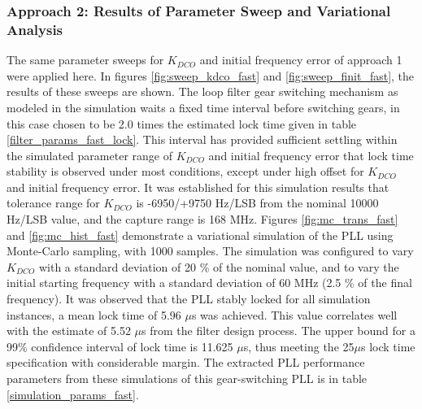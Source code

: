 \subsubsection{Approach 2: Results of Parameter Sweep and Variational Analysis}
The same parameter sweeps for $K_{DCO}$ and initial frequency error of approach 1 were applied here. In figures \ref{fig:sweep_kdco_fast} and \ref{fig:sweep_finit_fast}, the results of these sweeps are shown. The loop filter gear switching mechanism as modeled in the simulation waits a fixed time interval before switching gears, in this case chosen to be 2.0 times the estimated lock time given in table \ref{filter_params_fast_lock}. This interval has provided sufficient settling within the simulated parameter range of $K_{DCO}$ and initial frequency error that lock time stability is observed under most conditions, except under high offset for $K_{DCO}$ and initial frequency error. It was established for this simulation results that tolerance range for $K_{DCO}$ is -6950/+9750 Hz/LSB from the nominal 10000 Hz/LSB value, and the capture range is 168 MHz. Figures \ref{fig:mc_trans_fast} and \ref{fig:mc_hist_fast} demonstrate a variational simulation of the PLL using Monte-Carlo sampling, with 1000 samples. The simulation was configured to vary $K_{DCO}$ with a standard deviation of 20 \% of the nominal value, and to vary the initial starting frequency with a standard deviation of 60 MHz (2.5 \% of the final frequency). It was observed that the PLL stably locked for all simulation instances, a mean lock time of 5.96 $\mu$s was achieved. This value correlates well with the estimate of 5.52 $\mu$s from the filter design process. The upper bound for a 99\% confidence interval of lock time is 11.625 $\mu$s, thus meeting the 25$\mu$s lock time specification with considerable margin. The extracted PLL performance parameters from these simulations of this gear-switching PLL is in table \ref{simulation_params_fast}. 
